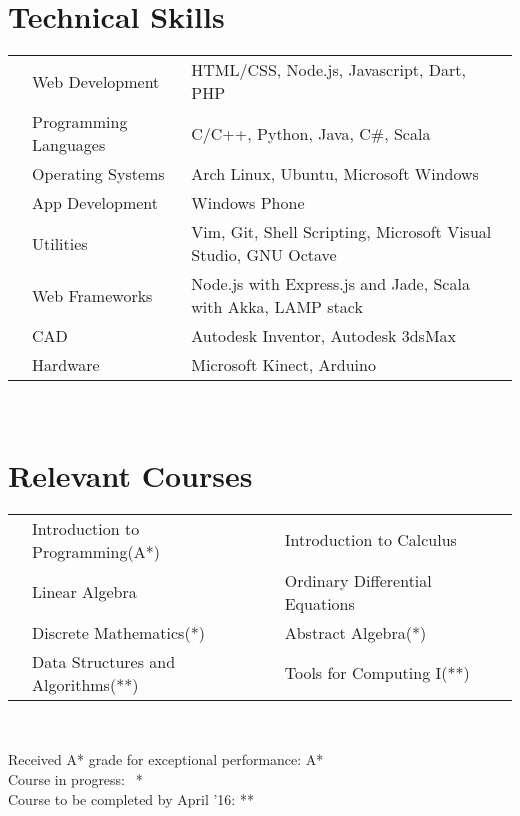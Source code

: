\documentclass[11pt,a4paper]{article}
\begin{document}
\section*{Technical Skills}
\begin{tabular}{L{0.05cm} L{5cm} l}
&Web Development 	        &HTML/CSS, Node.js, Javascript, Dart, PHP \\
&Programming Languages      &C/C++, Python, Java, C\#, Scala\\
&Operating Systems	        &Arch Linux, Ubuntu, Microsoft Windows\\
&App Development		    &Windows Phone\\
&Utilities                  &Vim, Git, Shell Scripting, Microsoft Visual Studio, GNU Octave\\
&Web Frameworks             &Node.js with Express.js and Jade, Scala with Akka, LAMP stack\\
&CAD	                	&Autodesk Inventor, Autodesk 3dsMax\\
&Hardware                   &Microsoft Kinect, Arduino\\

\end{tabular}\\


\section*{Relevant Courses}
\begin{tabular}{L{0.05cm} L{7cm} L{5.5cm} L{5.5cm}}
& Introduction to Programming(A*)    & Introduction to Calculus        \\
& Linear Algebra                     & Ordinary Differential  Equations\\
& Discrete Mathematics(*)            & Abstract Algebra(*)\\
& Data Structures and Algorithms(**) & Tools for Computing I(**)\\
\end{tabular}\\

\begin{flushright}
  \footnotesize{Received A* grade for exceptional performance: A*}\\
  \footnotesize{Course in progress:$\ \ $ *}\\
  \footnotesize{Course to be completed by April '16: **}\\
\end{flushright}

\
\end{document}
